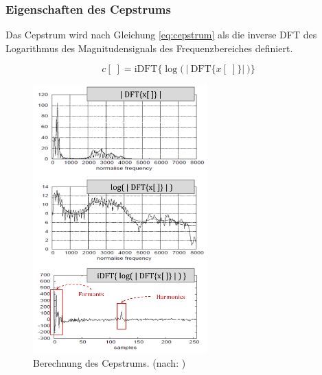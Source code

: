 \subsubsection{Eigenschaften des Cepstrums}
\label{sec:vad_ceps_features}

Das Cepstrum wird nach Gleichung \ref{eq:cepstrum} als die inverse DFT des Logarithmus des Magnitudensignals des Frequenzbereiches definiert.\cite[\emph{Cepstral Analysis}]{ricardo_ceps}

\begin{equation}
c[\;] =  \text{iDFT}\Big\{ \log \Big(\ \big|\ \text{DFT}\{x[\;]\} \big|\ \Big) \Big\}
\label{eq:cepstrum}
\end{equation}	

\begin{figure}[H]
	\centering
	\includegraphics[width=0.6\textwidth]{bilder/cepstrum04.png}
	\caption[Berechnung des Cepstrums]{Berechnung des Cepstrums. (nach: \cite[\emph{Cepstral Analysis}, S. 3]{ricardo_ceps})}
	\label{img:cepstrumOverview}
\end{figure}

